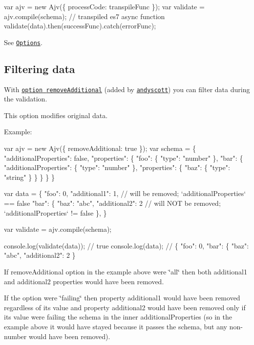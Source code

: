 \begin{DoxyCode}
var ajv = new Ajv(\{ processCode: transpileFunc \});
var validate = ajv.compile(schema); // transpiled es7 async function
validate(data).then(successFunc).catch(errorFunc);
\end{DoxyCode}


See \href{#options}{\tt Options}.

\subsection*{Filtering data}

With \href{#options}{\tt option {\ttfamily remove\+Additional}} (added by \href{https://github.com/andyscott}{\tt andyscott}) you can filter data during the validation.

This option modifies original data.

Example\+:


\begin{DoxyCode}
var ajv = new Ajv(\{ removeAdditional: true \});
var schema = \{
  "additionalProperties": false,
  "properties": \{
    "foo": \{ "type": "number" \},
    "bar": \{
      "additionalProperties": \{ "type": "number" \},
      "properties": \{
        "baz": \{ "type": "string" \}
      \}
    \}
  \}
\}

var data = \{
  "foo": 0,
  "additional1": 1, // will be removed; `additionalProperties` == false
  "bar": \{
    "baz": "abc",
    "additional2": 2 // will NOT be removed; `additionalProperties` != false
  \},
\}

var validate = ajv.compile(schema);

console.log(validate(data)); // true
console.log(data); // \{ "foo": 0, "bar": \{ "baz": "abc", "additional2": 2 \}
\end{DoxyCode}


If {\ttfamily remove\+Additional} option in the example above were {\ttfamily \char`\"{}all\char`\"{}} then both {\ttfamily additional1} and {\ttfamily additional2} properties would have been removed.

If the option were {\ttfamily \char`\"{}failing\char`\"{}} then property {\ttfamily additional1} would have been removed regardless of its value and property {\ttfamily additional2} would have been removed only if its value were failing the schema in the inner {\ttfamily additional\+Properties} (so in the example above it would have stayed because it passes the schema, but any non-\/number would have been removed).

